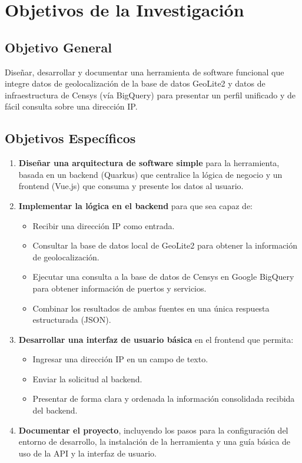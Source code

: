 \section{Objetivos de la Investigación}

\subsection{Objetivo General}
Diseñar, desarrollar y documentar una herramienta de software funcional que integre datos de geolocalización de la base de datos GeoLite2 y datos de infraestructura de Censys (vía BigQuery) para presentar un perfil unificado y de fácil consulta sobre una dirección IP.

\subsection{Objetivos Específicos}

\begin{enumerate}
    \item \textbf{Diseñar una arquitectura de software simple} para la herramienta, basada en un backend (Quarkus) que centralice la lógica de negocio y un frontend (Vue.js) que consuma y presente los datos al usuario.
    
    \item \textbf{Implementar la lógica en el backend} para que sea capaz de:
    \begin{itemize}
        \item Recibir una dirección IP como entrada.
        \item Consultar la base de datos local de GeoLite2 para obtener la información de geolocalización.
        \item Ejecutar una consulta a la base de datos de Censys en Google BigQuery para obtener información de puertos y servicios.
        \item Combinar los resultados de ambas fuentes en una única respuesta estructurada (JSON).
    \end{itemize}
    
    \item \textbf{Desarrollar una interfaz de usuario básica} en el frontend que permita:
    \begin{itemize}
        \item Ingresar una dirección IP en un campo de texto.
        \item Enviar la solicitud al backend.
        \item Presentar de forma clara y ordenada la información consolidada recibida del backend.
    \end{itemize}
    
    \item \textbf{Documentar el proyecto}, incluyendo los pasos para la configuración del entorno de desarrollo, la instalación de la herramienta y una guía básica de uso de la API y la interfaz de usuario.
\end{enumerate}
